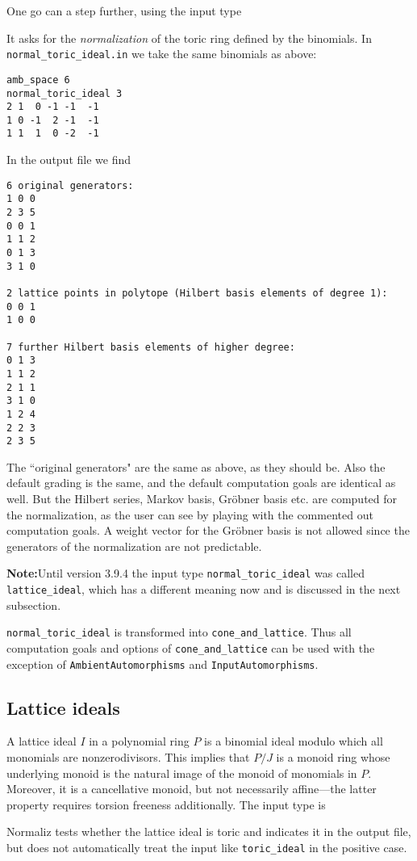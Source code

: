 One go can a step further, using the input type
\begin{itemize}
\end{itemize}
It asks for the \emph{normalization} of the toric ring defined by the binomials. In \verb|normal_toric_ideal.in| we take the same binomials  as above:
\begin{Verbatim}
amb_space 6
normal_toric_ideal 3
2 1  0 -1 -1  -1
1 0 -1  2 -1  -1
1 1  1  0 -2  -1
\end{Verbatim}
In the output file we find
\begin{Verbatim}
6 original generators:
1 0 0
2 3 5
0 0 1
1 1 2
0 1 3
3 1 0

2 lattice points in polytope (Hilbert basis elements of degree 1):
0 0 1
1 0 0

7 further Hilbert basis elements of higher degree:
0 1 3
1 1 2
2 1 1
3 1 0
1 2 4
2 2 3
2 3 5
\end{Verbatim}
The ``original generators" are the same as above, as they should be. Also the default grading is the same, and the default computation goals are identical as well. But the Hilbert series, Markov basis, Gröbner basis etc. are computed for the normalization, as the user can see by playing with the commented out computation goals. A weight vector for the Gröbner basis is not allowed since the generators of the normalization are not predictable.

\textbf{Note:}\enspace Until version 3.9.4 the input type \verb|normal_toric_ideal| was called \verb|lattice_ideal|, which has a different meaning now and is discussed in the next subsection.

\verb|normal_toric_ideal| is transformed into \verb|cone_and_lattice|. Thus all computation goals and options of \verb|cone_and_lattice| can be used with the exception of \verb|AmbientAutomorphisms| and \verb|InputAutomorphisms|.

\subsection{Lattice ideals}\label{lattice_ideal}

A lattice ideal $I$ in a polynomial ring $P$ is a binomial ideal modulo which all monomials are nonzerodivisors. This implies that $P/J$ is a monoid ring whose underlying monoid is the natural image of the monoid of monomials in $P$. Moreover, it is a cancellative monoid, but not necessarily affine---the latter property requires torsion freeness additionally. The input type is
\begin{itemize}
\end{itemize}
Normaliz tests whether the lattice ideal is toric and indicates it in the output file, but does not automatically treat the input like \verb|toric_ideal| in the positive case.

